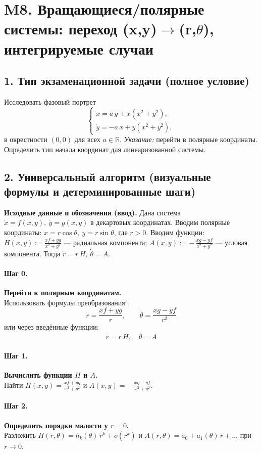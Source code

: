 \section{M8. Вращающиеся/полярные системы: переход (x,y)$\to$(r,$\theta$), интегрируемые случаи}

\subsection*{1. Тип экзаменационной задачи (полное условие)}
Исследовать фазовый портрет
\[
\begin{cases}
\dot{x}=a\,y+x(x^{2}+y^{2}),\\
\dot{y}=-a\,x+y(x^{2}+y^{2}),
\end{cases}
\]
в окрестности \((0,0)\) для всех \(a\in\mathbb R\). \textit{Указание:} перейти в полярные координаты. Определить тип начала координат для линеаризованной системы.

\subsection*{2. Универсальный алгоритм (визуальные формулы и детерминированные шаги)}

\textbf{Исходные данные и обозначения (ввод).} Дана система \(\dot x=f(x,y),\ \dot y=g(x,y)\) в декартовых координатах.
Вводим полярные координаты: \(x=r\cos\theta,\ y=r\sin\theta\), где \(r>0\).
Вводим функции: \(H(x,y):=\frac{x f+y g}{x^{2}+y^{2}}\) — радиальная компонента; \(A(x,y):=-\,\frac{x g-y f}{x^{2}+y^{2}}\) — угловая компонента.
Тогда \(\dot r=r\,H,\ \dot\theta=A\).

\paragraph{Шаг 0.} \textbf{Перейти к полярным координатам.}\\
Использовать формулы преобразования:
\[
\boxed{\ \dot r=\frac{x f+y g}{r},\qquad \dot\theta=\frac{x g-y f}{r^{2}}\ }
\]
или через введённые функции:
\[
\boxed{\ \dot r=r\,H,\quad \dot\theta=A\ }
\]

\paragraph{Шаг 1.} \textbf{Вычислить функции \(H\) и \(A\).}\\
Найти \(H(x,y)=\frac{x f+y g}{x^{2}+y^{2}}\) и \(A(x,y)=-\,\frac{x g-y f}{x^{2}+y^{2}}\).

\paragraph{Шаг 2.} \textbf{Определить порядки малости у \(r=0\).}\\
Разложить \(H(r,\theta)=h_k(\theta)\,r^{k}+o(r^{k})\) и \(A(r,\theta)=a_0+ a_1(\theta)\,r+\dots\) при \(r\to 0\).

